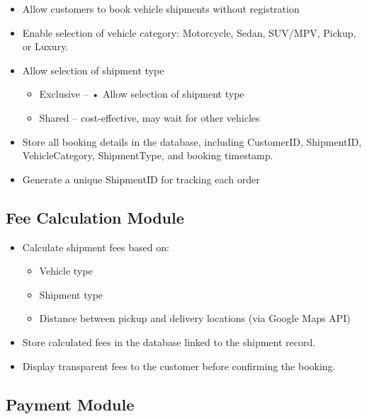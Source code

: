\documentclass[12pt,a4paper]{article}
\begin{document}
\begin{itemize}

\item Allow customers to book vehicle shipments without registration
\item Enable selection of vehicle category: Motorcycle, Sedan, SUV/MPV, Pickup, or Luxury.
\item Allow selection of shipment type
    \begin{itemize}
    \item Exclusive – •	Allow selection of shipment type
    \item Shared – cost-effective, may wait for other vehicles
    \end{itemize}
\item Store all booking details in the database, including CustomerID, ShipmentID, VehicleCategory, ShipmentType, and booking timestamp.
\item Generate a unique ShipmentID for tracking each order

\end{itemize}

\subsection{Fee Calculation Module}

\begin{itemize}

\item Calculate shipment fees based on:
    \begin{itemize}
    \item Vehicle type
    \item Shipment type
    \item Distance between pickup and delivery locations (via Google Maps API)
    \end{itemize}

\item   Store calculated fees in the database linked to the shipment record.
\item 	Display transparent fees to the customer before confirming the booking.

\end{itemize}

\subsection{Payment Module}
\end{document}
